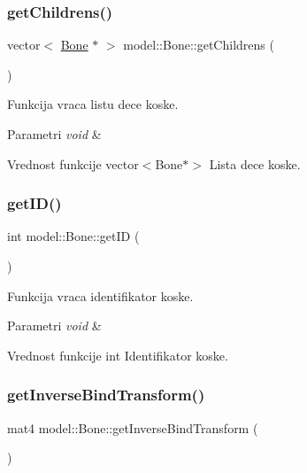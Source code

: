 \subsubsection{\texorpdfstring{get\+Childrens()}{getChildrens()}}
{\footnotesize\ttfamily vector$<$ \hyperlink{classmodel_1_1Bone}{Bone} $\ast$ $>$ model\+::\+Bone\+::get\+Childrens (\begin{DoxyParamCaption}{ }\end{DoxyParamCaption})}



Funkcija vraca listu dece koske. 


\begin{DoxyParams}{Parametri}
{\em void} & \\
\hline
\end{DoxyParams}
\begin{DoxyReturn}{Vrednost funkcije}
vector$<$\+Bone$\ast$$>$ Lista dece koske. 
\end{DoxyReturn}
\mbox{\label{classmodel_1_1Bone_a4af3fc3d883998c6a01b76f73a228d6d}} 
\subsubsection{\texorpdfstring{get\+I\+D()}{getID()}}
{\footnotesize\ttfamily int model\+::\+Bone\+::get\+ID (\begin{DoxyParamCaption}{ }\end{DoxyParamCaption})}



Funkcija vraca identifikator koske. 


\begin{DoxyParams}{Parametri}
{\em void} & \\
\hline
\end{DoxyParams}
\begin{DoxyReturn}{Vrednost funkcije}
int Identifikator koske. 
\end{DoxyReturn}
\mbox{\label{classmodel_1_1Bone_a96a871fa5d08586c5ba8720bc6de72e1}} 
\subsubsection{\texorpdfstring{get\+Inverse\+Bind\+Transform()}{getInverseBindTransform()}}
{\footnotesize\ttfamily mat4 model\+::\+Bone\+::get\+Inverse\+Bind\+Transform (\begin{DoxyParamCaption}{ }\end{DoxyParamCaption})}



